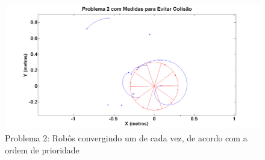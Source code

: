 \begin{figure}[!htb]
	\centering
	\includegraphics[width=.9\linewidth]{./04-figuras/Simulacoes/Problema2/Colisao/P2_C1}
	\caption{Problema 2: Robôs convergindo um de cada vez, de acordo com a ordem de prioridade}
	\label{fig:P2C}
\end{figure}
